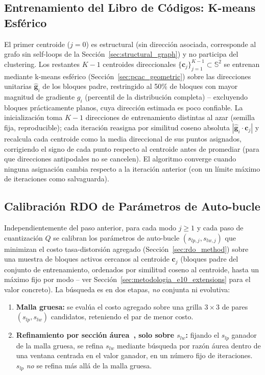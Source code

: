     \subsection{Entrenamiento del Libro de Códigos: K-means Esférico}\label{sec:codebook_training_real}

El primer centroide ($j=0$) es estructural (sin dirección asociada, corresponde al grafo sin
self-loops de la Sección~\ref{sec:structural_graph}) y no participa del clustering. Los
restantes $K-1$ centroides direccionales $\{\mathbf{c}_j\}_{j=1}^{K-1} \subset \mathbb{S}^2$ se
entrenan mediante k-means esférico (Sección~\ref{sec:pcac_geometric}) sobre las direcciones
unitarias $\hat{\mathbf{g}}_i$ de los bloques padre, restringido al 50\% de bloques con mayor
magnitud de gradiente $g_i$ (percentil de la distribución completa) -- excluyendo bloques
prácticamente planos, cuya dirección estimada es poco confiable. La inicialización toma $K-1$
direcciones de entrenamiento distintas al azar (semilla fija, reproducible); cada iteración
reasigna por similitud coseno absoluta $|\hat{\mathbf{g}}_i \cdot \mathbf{c}_j|$ y recalcula cada
centroide como la media direccional de sus puntos asignados, corrigiendo el signo de cada punto
respecto al centroide antes de promediar (para que direcciones antipodales no se cancelen). El
algoritmo converge cuando ninguna asignación cambia respecto a la iteración anterior (con un
límite máximo de iteraciones como salvaguarda).

    \subsection{Calibración RDO de Parámetros de Auto-bucle}\label{sec:adapter_rdo_real}

Independientemente del paso anterior, para cada modo $j\geq1$ y cada paso de cuantización $Q$ se
calibran los parámetros de auto-bucle $(s_{lp,j}, s_{lw,j})$ que minimizan el costo
tasa-distorsión agregado (Sección~\ref{sec:rdo_method}) sobre una muestra de bloques activos
cercanos al centroide $\mathbf{c}_j$ (bloques padre del conjunto de entrenamiento, ordenados por
similitud coseno al centroide, hasta un máximo fijo por modo -- ver
Sección~\ref{sec:metodologia_e10_extensions} para el valor concreto). La búsqueda es en dos
etapas, \emph{no} conjunta ni evolutiva:

\begin{enumerate}
    \item \textbf{Malla gruesa:} se evalúa el costo agregado sobre una grilla $3\times3$ de
    pares $(s_{lp}, s_{lw})$ candidatos, reteniendo el par de menor costo.
    \item \textbf{Refinamiento por sección áurea~\cite{kiefer1953sequential}, solo sobre $s_{lw}$:} fijando el $s_{lp}$
    ganador de la malla gruesa, se refina $s_{lw}$ mediante búsqueda por razón áurea dentro de
    una ventana centrada en el valor ganador, en un número fijo de iteraciones. $s_{lp}$
    \emph{no} se refina más allá de la malla gruesa.
\end{enumerate}

